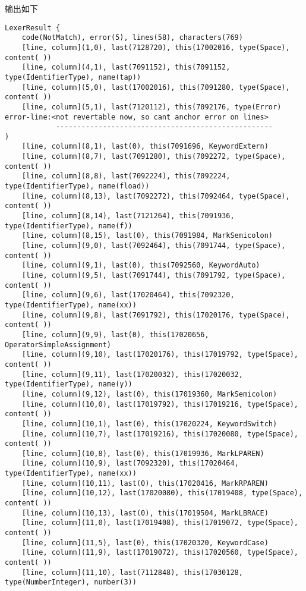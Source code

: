\documentclass[UTF8]{ctexart}
\begin{document}
输出如下
{\firacode
\begin{lstlisting}[language={[ANSI]C++}]
LexerResult {
    code(NotMatch), error(5), lines(58), characters(769)
    [line, column](1,0), last(7128720), this(17002016, type(Space), content( ))
    [line, column](4,1), last(7091152), this(7091152, type(IdentifierType), name(tap))
    [line, column](5,0), last(17002016), this(7091280, type(Space), content( ))
    [line, column](5,1), last(7120112), this(7092176, type(Error)
error-line:<not revertable now, so cant anchor error on lines>
            ---------------------------------------------------
)
    [line, column](8,1), last(0), this(7091696, KeywordExtern)
    [line, column](8,7), last(7091280), this(7092272, type(Space), content( ))
    [line, column](8,8), last(7092224), this(7092224, type(IdentifierType), name(fload))
    [line, column](8,13), last(7092272), this(7092464, type(Space), content( ))
    [line, column](8,14), last(7121264), this(7091936, type(IdentifierType), name(f))
    [line, column](8,15), last(0), this(7091984, MarkSemicolon)
    [line, column](9,0), last(7092464), this(7091744, type(Space), content( ))
    [line, column](9,1), last(0), this(7092560, KeywordAuto)
    [line, column](9,5), last(7091744), this(7091792, type(Space), content( ))
    [line, column](9,6), last(17020464), this(7092320, type(IdentifierType), name(xx))
    [line, column](9,8), last(7091792), this(17020176, type(Space), content( ))
    [line, column](9,9), last(0), this(17020656, OperatorSimpleAssignment)
    [line, column](9,10), last(17020176), this(17019792, type(Space), content( ))
    [line, column](9,11), last(17020032), this(17020032, type(IdentifierType), name(y))
    [line, column](9,12), last(0), this(17019360, MarkSemicolon)
    [line, column](10,0), last(17019792), this(17019216, type(Space), content( ))
    [line, column](10,1), last(0), this(17020224, KeywordSwitch)
    [line, column](10,7), last(17019216), this(17020080, type(Space), content( ))
    [line, column](10,8), last(0), this(17019936, MarkLPAREN)
    [line, column](10,9), last(7092320), this(17020464, type(IdentifierType), name(xx))
    [line, column](10,11), last(0), this(17020416, MarkRPAREN)
    [line, column](10,12), last(17020080), this(17019408, type(Space), content( ))
    [line, column](10,13), last(0), this(17019504, MarkLBRACE)
    [line, column](11,0), last(17019408), this(17019072, type(Space), content( ))
    [line, column](11,5), last(0), this(17020320, KeywordCase)
    [line, column](11,9), last(17019072), this(17020560, type(Space), content( ))
    [line, column](11,10), last(7112848), this(17030128, type(NumberInteger), number(3))

\end{lstlisting}}
\end{document}
